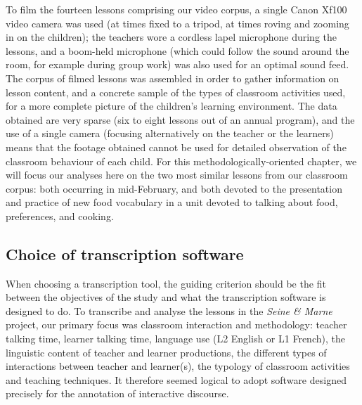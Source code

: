 \documentclass[output=paper,colorlinks,citecolor=brown,modfonts,nonflat]{../langscibook}
\begin{document}
To film the fourteen lessons comprising our video corpus, a single Canon Xf100 video camera was used (at times fixed to a tripod, at times roving and zooming in on the children); the teachers wore a cordless lapel microphone during the lessons, and a boom-held microphone (which could follow the sound around the room, for example during group work) was also used for an optimal sound feed. The corpus of filmed lessons was assembled in order to gather information on lesson content, and a concrete sample of the types of classroom activities used, for a more complete picture of the children’s learning environment. The data obtained are very sparse (six to eight lessons out of an annual program), and the use of a single camera (focusing alternatively on the teacher or the learners) means that the footage obtained cannot be used for detailed observation of the classroom behaviour of each child. For this methodologically-oriented chapter, we will focus our analyses here on the two most similar lessons from our classroom corpus: both occurring in mid-February, and both devoted to the presentation and practice of new food vocabulary in a unit devoted to talking about food, preferences, and cooking.

\subsection{Choice of transcription software}

When choosing a transcription tool, the guiding criterion should be the fit between the objectives of the study and what the transcription software is designed to do. To transcribe and analyse the lessons in the \textit{Seine \&  Marne} project, our primary focus was classroom interaction and methodology: teacher talking time, learner talking time, language use (L2 English or L1 French), the linguistic content of teacher and learner productions, the different types of interactions between teacher and learner(s), the typology of classroom activities and teaching techniques. It therefore seemed logical to adopt software designed precisely for the annotation of interactive discourse. 
\end{document}
